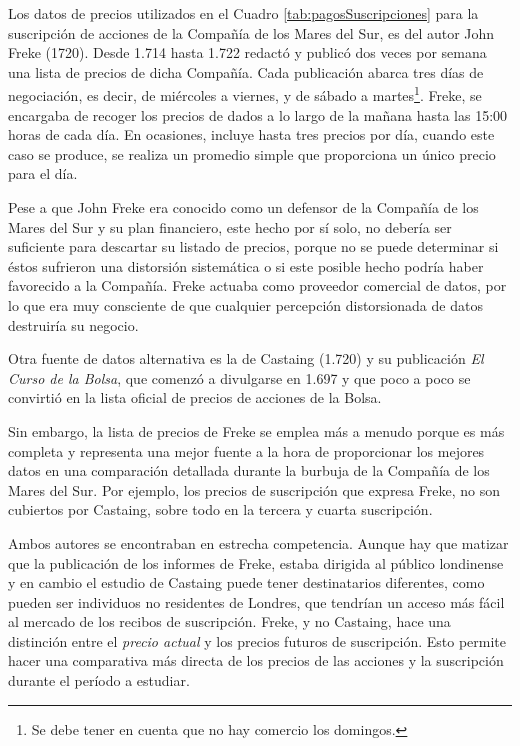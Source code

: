 


Los datos de precios utilizados en el Cuadro \ref{tab:pagosSuscripciones} para la suscripción de acciones de la Compañía de los Mares del Sur, es del autor John Freke (1720).  Desde 1.714 hasta 1.722 redactó y publicó dos veces por semana una lista de precios de dicha Compañía. Cada publicación abarca tres días de negociación, es decir, de miércoles a viernes, y de sábado a martes\footnote{Se debe tener en cuenta que no hay comercio los domingos.}. Freke, se encargaba de recoger los precios de dados a lo largo de la mañana hasta las 15:00 horas de cada día. En ocasiones, incluye hasta tres precios por día, cuando este caso se produce, se realiza un promedio simple que proporciona un único precio para el día. 

Pese a que John Freke era conocido como un defensor de la Compañía de los Mares del Sur y su plan financiero, este hecho por sí solo, no debería ser suficiente para descartar su listado de precios, porque no se puede determinar si éstos sufrieron una distorsión sistemática o si este posible hecho podría haber favorecido a la Compañía. Freke actuaba como proveedor comercial de datos, por lo que era muy consciente de que cualquier percepción distorsionada de datos destruiría su negocio. 

Otra fuente de datos alternativa es la de Castaing (1.720) y su publicación \emph{El Curso de la Bolsa}, que comenzó a divulgarse en 1.697 y que poco a poco se convirtió en la lista oficial de precios de acciones de la Bolsa.

Sin embargo, la lista de precios de Freke se emplea más a menudo porque es más completa y representa una mejor fuente a la hora de proporcionar los mejores datos en una comparación detallada durante la burbuja de la Compañía de los Mares del Sur. Por ejemplo, los precios de suscripción que expresa Freke, no son cubiertos por Castaing, sobre todo en la tercera y cuarta suscripción. 

Ambos autores se encontraban en estrecha competencia. Aunque hay que matizar que la publicación de los informes de Freke, estaba dirigida al público londinense y en cambio el estudio de Castaing puede tener destinatarios diferentes, como pueden ser individuos no residentes de Londres, que tendrían un acceso más fácil al mercado de los recibos de suscripción.  Freke, y no Castaing, hace una distinción entre el \emph{precio actual} y los precios futuros de suscripción. Esto permite hacer una comparativa más directa de los precios de las acciones y la suscripción durante el período a estudiar. 

